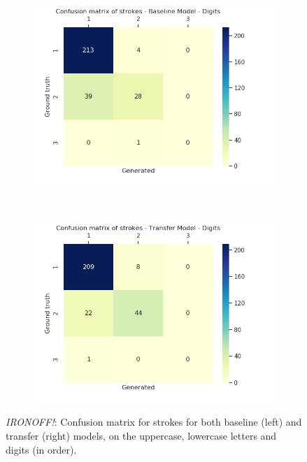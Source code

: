 \begin{figure}[!htbp]
        ~
        \begin{subfigure}[tb]{0.45\textwidth}
            \includegraphics[width=\textwidth]{images/sota/ironoff_results/True_digits_strokes_heatmap.png}
        \end{subfigure}
        ~
        \begin{subfigure}[tb]{0.45\textwidth}
            \includegraphics[width=\textwidth]{images/sota/ironoff_results/False_digits_strokes_heatmap.png}
        \end{subfigure}

        \caption{\textit{IRONOFF!}: Confusion matrix for strokes for both baseline (left) and transfer (right) models, on the uppercase, lowercase letters and digits (in order).}
        \label{fig:ironoff_strokes_cnf}

      \end{figure}

